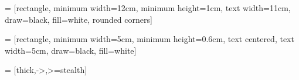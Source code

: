 \usepackage{tikz}
\usetikzlibrary{shapes.geometric, arrows}

 = [rectangle, 
minimum width=12cm, 
minimum height=1cm, 
text width=11cm, 
draw=black, 
fill=white,
rounded corners]

 = [rectangle, 
minimum width=5cm, 
minimum height=0.6cm, 
text centered, 
text width=5cm, 
draw=black, 
fill=white]

 = [thick,->,>=stealth]